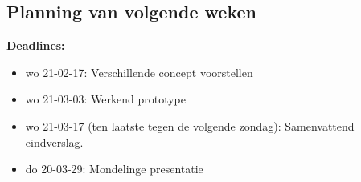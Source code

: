 \subsection{Planning van volgende weken}%
\label{sub:Planning van volgende weken}

\textbf{Deadlines:} 
\begin{itemize}
	\item wo 21-02-17: Verschillende concept voorstellen
	\item wo 21-03-03: Werkend prototype
	\item wo 21-03-17 (ten laatste tegen de volgende zondag): Samenvattend eindverslag.
	\item do 20-03-29: Mondelinge presentatie
\end{itemize}
